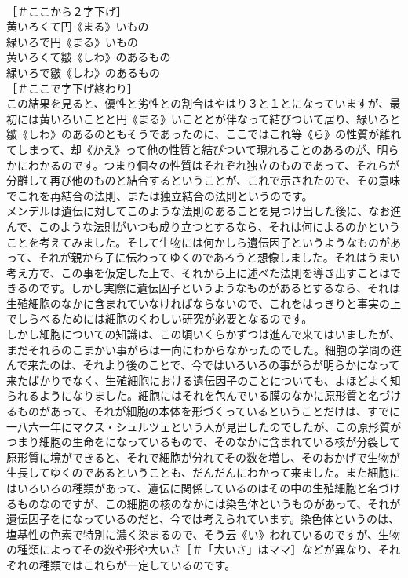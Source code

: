 \documentclass[8pt]{extreport}
\begin{document}
\begin{CJK}{UTF8}{min}
\\	［＃ここから２字下げ］
\\	黄いろくて円《まる》いもの　　　　
\\	緑いろで円《まる》いもの　　　　　
\\	黄いろくて皺《しわ》のあるもの　　
\\	緑いろで皺《しわ》のあるもの　　　
\\	［＃ここで字下げ終わり］
\\	この結果を見ると、優性と劣性との割合はやはり３と１とになっていますが、最初には黄いろいことと円《まる》いこととが伴なって結びついて居り、緑いろと皺《しわ》のあるのともそうであったのに、ここではこれ等《ら》の性質が離れてしまって、却《かえ》って他の性質と結びついて現れることのあるのが、明らかにわかるのです。つまり個々の性質はそれぞれ独立のものであって、それらが分離して再び他のものと結合するということが、これで示されたので、その意味でこれを再結合の法則、または独立結合の法則というのです。
\\	メンデルは遺伝に対してこのような法則のあることを見つけ出した後に、なお進んで、このような法則がいつも成り立つとするなら、それは何によるのかということを考えてみました。そして生物には何かしら遺伝因子というようなものがあって、それが親から子に伝わってゆくのであろうと想像しました。それはうまい考え方で、この事を仮定した上で、それから上に述べた法則を導き出すことはできるのです。しかし実際に遺伝因子というようなものがあるとするなら、それは生殖細胞のなかに含まれていなければならないので、これをはっきりと事実の上でしらべるためには細胞のくわしい研究が必要となるのです。
\\	しかし細胞についての知識は、この頃いくらかずつは進んで来てはいましたが、まだそれらのこまかい事がらは一向にわからなかったのでした。細胞の学問の進んで来たのは、それより後のことで、今ではいろいろの事がらが明らかになって来たばかりでなく、生殖細胞における遺伝因子のことについても、よほどよく知られるようになりました。細胞にはそれを包んでいる膜のなかに原形質と名づけるものがあって、それが細胞の本体を形づくっているということだけは、すでに一八六一年にマクス・シュルツェという人が見出したのでしたが、この原形質がつまり細胞の生命をになっているもので、そのなかに含まれている核が分裂して原形質に境ができると、それで細胞が分れてその数を増し、そのおかげで生物が生長してゆくのであるということも、だんだんにわかって来ました。また細胞にはいろいろの種類があって、遺伝に関係しているのはその中の生殖細胞と名づけるものなのですが、この細胞の核のなかには染色体というものがあって、それが遺伝因子をになっているのだと、今では考えられています。染色体というのは、塩基性の色素で特別に濃く染まるので、そう云《い》われているのですが、生物の種類によってその数や形や大いさ［＃「大いさ」はママ］などが異なり、それぞれの種類ではこれらが一定しているのです。

\end{CJK}
\end{document}
